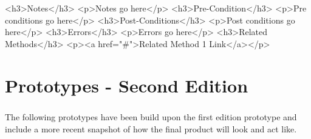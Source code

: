\documentclass[letterpaper,12pt]{report}
\begin{document}
{\newline
\hspace*{0.5cm}<h3>Notes</h3>\linebreak
\hspace*{1cm}<p>Notes go here</p>\linebreak
\newline
\hspace*{0.5cm}<h3>Pre-Condition</h3>\linebreak
\hspace*{1cm}<p>Pre conditions go here</p>\linebreak
\newline
\hspace*{0.5cm}<h3>Post-Conditions</h3>\linebreak
\hspace*{1cm}<p>Post conditions go here</p>\linebreak
\newline
\hspace*{0.5cm}<h3>Errors</h3>\linebreak
\hspace*{1cm}<p>Errors go here</p>\linebreak
\newline
\hspace*{0.5cm}<h3>Related Methods</h3>\linebreak
\hspace*{1cm}<p><a href="\#">Related Method 1 Link</a></p>\linebreak }


\chapter{Prototypes - Second Edition}
\paragraph*{}\hspace{0.6cm}The following prototypes have been build upon the first edition prototype and include a more recent snapshot of how the final product will look and act like.
\end{document}
